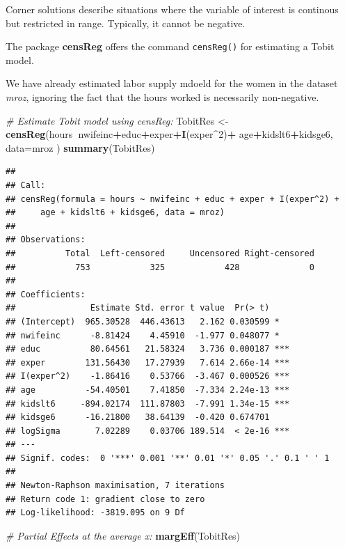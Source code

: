 \documentclass[]{book}
\newenvironment{Shaded}{\begin{snugshade}}{\end{snugshade}}
\newcommand{\CommentTok}[1]{\textcolor[rgb]{0.56,0.35,0.01}{\textit{#1}}}
\newcommand{\DataTypeTok}[1]{\textcolor[rgb]{0.13,0.29,0.53}{#1}}
\newcommand{\DecValTok}[1]{\textcolor[rgb]{0.00,0.00,0.81}{#1}}
\newcommand{\KeywordTok}[1]{\textcolor[rgb]{0.13,0.29,0.53}{\textbf{#1}}}
\newcommand{\NormalTok}[1]{#1}
\newcommand{\OperatorTok}[1]{\textcolor[rgb]{0.81,0.36,0.00}{\textbf{#1}}}
\newcommand{\StringTok}[1]{\textcolor[rgb]{0.31,0.60,0.02}{#1}}
\begin{document}
Corner solutions describe situations where the variable of interest is
continous but restricted in range. Typically, it cannot be negative.

The package \textbf{censReg} offers the command \texttt{censReg()} for
estimating a Tobit model.

We have already estimated labor supply mdoeld for the women in the
dataset \emph{mroz}, ignoring the fact that the hours worked is
necessarily non-negative.

\begin{Shaded}
\begin{Highlighting}[]
\CommentTok{# Estimate Tobit model using censReg:}
\NormalTok{TobitRes <-}\StringTok{ }\KeywordTok{censReg}\NormalTok{(hours}\OperatorTok{~}\NormalTok{nwifeinc}\OperatorTok{+}\NormalTok{educ}\OperatorTok{+}\NormalTok{exper}\OperatorTok{+}\KeywordTok{I}\NormalTok{(exper}\OperatorTok{^}\DecValTok{2}\NormalTok{)}\OperatorTok{+}\StringTok{ }
\StringTok{                      }\NormalTok{age}\OperatorTok{+}\NormalTok{kidslt6}\OperatorTok{+}\NormalTok{kidsge6, }\DataTypeTok{data=}\NormalTok{mroz )}
\KeywordTok{summary}\NormalTok{(TobitRes)}
\end{Highlighting}
\end{Shaded}

\begin{verbatim}
## 
## Call:
## censReg(formula = hours ~ nwifeinc + educ + exper + I(exper^2) + 
##     age + kidslt6 + kidsge6, data = mroz)
## 
## Observations:
##          Total  Left-censored     Uncensored Right-censored 
##            753            325            428              0 
## 
## Coefficients:
##               Estimate Std. error t value  Pr(> t)    
## (Intercept)  965.30528  446.43613   2.162 0.030599 *  
## nwifeinc      -8.81424    4.45910  -1.977 0.048077 *  
## educ          80.64561   21.58324   3.736 0.000187 ***
## exper        131.56430   17.27939   7.614 2.66e-14 ***
## I(exper^2)    -1.86416    0.53766  -3.467 0.000526 ***
## age          -54.40501    7.41850  -7.334 2.24e-13 ***
## kidslt6     -894.02174  111.87803  -7.991 1.34e-15 ***
## kidsge6      -16.21800   38.64139  -0.420 0.674701    
## logSigma       7.02289    0.03706 189.514  < 2e-16 ***
## ---
## Signif. codes:  0 '***' 0.001 '**' 0.01 '*' 0.05 '.' 0.1 ' ' 1
## 
## Newton-Raphson maximisation, 7 iterations
## Return code 1: gradient close to zero
## Log-likelihood: -3819.095 on 9 Df
\end{verbatim}

\begin{Shaded}
\begin{Highlighting}[]
\CommentTok{# Partial Effects at the average x:}
\KeywordTok{margEff}\NormalTok{(TobitRes)}
\end{Highlighting}
\end{Shaded}
\end{document}
